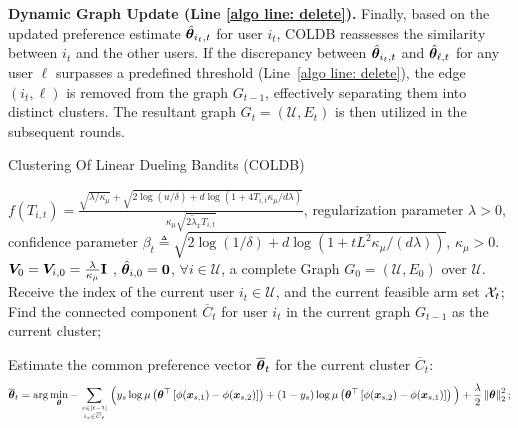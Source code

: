 \noindent\textbf{Dynamic Graph Update (Line \ref{algo line: delete}).} Finally, based on the updated preference estimate $\hat{\boldsymbol{\theta}}_{i_t,t}$ for user $i_t$, COLDB reassesses the similarity between $i_t$ and the other users. If the discrepancy between $\hat{\boldsymbol{\theta}}_{i_t,t}$ and $\hat{\boldsymbol{\theta}}_{\ell,t}$ for any user $\ell$ surpasses a predefined threshold (Line~\ref{algo line: delete}), the edge $(i_t, \ell)$ is removed from the graph $G_{t-1}$, effectively separating them into distinct clusters. The resultant graph $G_t = (\mathcal{U}, E_t)$ is then utilized in the subsequent rounds.

\begin{algorithm*}[t!] 
\caption{Clustering Of Linear Dueling Bandits (COLDB)}
\label{algo:linear:dueling:bandits}
	\begin{algorithmic}[1]
     $f(T_{i,t})=\frac{\sqrt{\lambda/\kappa_\mu}+\sqrt{2\log(u/\delta)+d\log(1+4T_{i,t}\kappa_\mu/d\lambda)}}{\kappa_\mu{\sqrt{2\tilde{\lambda}_x T_{i,t}}}}$, regularization parameter $\lambda>0$, confidence parameter $\beta_t \triangleq \sqrt{2\log(1/\delta) + d\log\left( 1 + tL^2\kappa_{\mu}/(d\lambda) \right)}$, $\kappa_\mu>0$.
$\boldsymbol{V}_0=\boldsymbol{V}_{i,0} = \frac{\lambda}{\kappa_\mu} \mathbf{I}$ , $\hat{\boldsymbol{\theta}}_{i,0}=\boldsymbol{0}$, $\forall{i \in \mathcal{U}}$, a complete Graph $G_0 = (\mathcal{U},E_0)$ over $\mathcal{U}$.
            \STATE Receive the index of the current user $i_t\in\mathcal{U}$, and the current feasible arm set $\mathcal{X}_t$;
            \STATE Find the connected component $\overline C_t$ for user $i_t$ in the current graph $G_{t-1}$ as the current cluster; 
            
            \STATE Estimate the common preference vector $\overline{\boldsymbol{\theta}}_t$ for the current cluster $\overline C_t$:
            \begin{equation}
                \overline{\boldsymbol{\theta}}_t=\arg\min_{\boldsymbol{\theta}} - \sum_{s\in[t-1]\atop i_s\in \overline C_t} \Big( y_s\log\mu\left({\boldsymbol{\theta}}^{\top}\left[\phi(\boldsymbol{x}_{s,1}) - \phi(\boldsymbol{x}_{s,2})\right]\right) + (1-y_s)\log\mu\left({\boldsymbol{\theta}}^{\top}\left[\phi(\boldsymbol{x}_{s,2}) - \phi(\boldsymbol{x}_{s,1})\right]\right) \Big) + \frac{\lambda}{2}\left\| \boldsymbol{\theta} \right\|_2^2;
            \end{equation}
            

\end{algorithmic}
\end{algorithm*}
